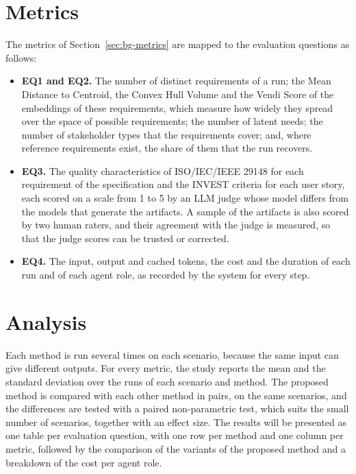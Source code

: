 \section{Metrics}
\label{sec:eval-metrics}

The metrics of Section~\ref{sec:bg-metrics} are mapped to the evaluation questions as follows:
\begin{itemize}
    \item \textbf{EQ1 and EQ2.} The number of distinct requirements of a run; the Mean Distance to Centroid, the Convex Hull Volume and the Vendi Score of the embeddings of these requirements, which measure how widely they spread over the space of possible requirements; the number of latent needs; the number of stakeholder types that the requirements cover; and, where reference requirements exist, the share of them that the run recovers.
    \item \textbf{EQ3.} The quality characteristics of ISO/IEC/IEEE 29148 for each requirement of the specification and the INVEST criteria for each user story, each scored on a scale from 1 to 5 by an LLM judge whose model differs from the models that generate the artifacts. A sample of the artifacts is also scored by two human raters, and their agreement with the judge is measured, so that the judge scores can be trusted or corrected.
    \item \textbf{EQ4.} The input, output and cached tokens, the cost and the duration of each run and of each agent role, as recorded by the system for every step.
\end{itemize}

\section{Analysis}
\label{sec:eval-analysis}

Each method is run several times on each scenario, because the same input can give different outputs. For every metric, the study reports the mean and the standard deviation over the runs of each scenario and method. The proposed method is compared with each other method in pairs, on the same scenarios, and the differences are tested with a paired non-parametric test, which suits the small number of scenarios, together with an effect size. The results will be presented as one table per evaluation question, with one row per method and one column per metric, followed by the comparison of the variants of the proposed method and a breakdown of the cost per agent role.

